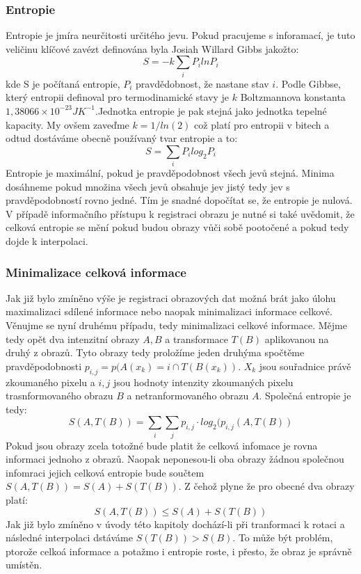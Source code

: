 \documentclass{thesis}%
\begin{document}
\subsubsection{Entropie}
Entropie je jmíra neurčitosti určitého jevu. Pokud pracujeme s inforamací, je tuto veličinu klíčové zavézt definována byla Josiah Willard Gibbs jakožto:
\begin{equation}
 S = - k\sum\limits_{i} P_i ln P_i
\end{equation}
kde S je počítaná entropie, $P_i$ pravdědobnost, že nastane stav $i$. Podle Gibbse, který entropii definoval pro termodinamické stavy je $k$ Boltzmannova konstanta $1,380 66×10^{-23} J K^{-1}$.Jednotka entropie je pak stejná jako jednotka tepelné kapacity. My ovšem zaveďme $k = 1/ln(2)$ což platí pro entropii v bitech a odtud dostáváme obecně používaný tvar entropie a to:
\begin{equation}
 S = \sum\limits_{i} P_i log_2 P_i
\end{equation}
Entropie je maximální, pokud je pravděpodobnost všech jevů stejná. Minima dosáhneme pokud množina všech jevů obsahuje jev jistý tedy jev s pravděpodobností rovno jedné. Tím je snadné dopočítat se, že entropie je nulová. V případě informačního přístupu k registraci obrazu je nutné si také uvědomit, že celková entropie se mění pokud budou obrazy vůči sobě pootočené a pokud tedy dojde k interpolaci.  
\subsubsection{Minimalizace celková informace}
Jak již bylo zmíněno výše je registraci obrazových dat možná brát jako úlohu maximalizaci sdílené informace nebo naopak minimalizaci informace celkové. Věnujme se nyní druhému případu, tedy minimalizaci celkové informace. Mějme tedy opět dva intenzitní obrazy $A, B$ a transformace $T(B)$ aplikovanou na druhý z obrazů. Tyto obrazy tedy proložíme jeden druhýma spočtěme pravděpodobnosti $p_{i,j}=p(A(x_k)= i \cap T(B(x_k))$. $X_k$ jsou souřadnice právě zkoumaného pixelu a $i,j$ jsou hodnoty intenzity zkoumaných pixelu trasnformovaného obrazu $B$ a netranformovaného obrazu $A$. Společná entropie je tedy:
\begin{equation}
 S(A,T(B)) = \sum\limits_{i}\sum\limits_{j} p_{i,j}\cdot log_2 (p_{i,j}(A,T(B))
\end{equation}
Pokud jsou obrazy zcela totožné bude platit že celková infomace je rovna informaci jednoho z obrazů. Naopak neponesou-li oba obrazy žádnou společnou infomraci jejich celková entropie bude součtem $S(A,T(B)) = S(A) + S(T(B))$. Z čehož plyne že pro obecné dva obrazy platí:
\begin{equation}
 S(A,T(B)) \leq S(A) + S(T(B)) 
\end{equation}
Jak již bylo zmíněno v úvody této kapitoly dochází-li při tranformaci k rotaci a následné interpolaci dstáváme $S(T(B)) > S(B)$. To může být problém, ptorože celkoá informace a potažmo i entropie roste, i přesto, že obraz je správně umístěn.
\end{document}

